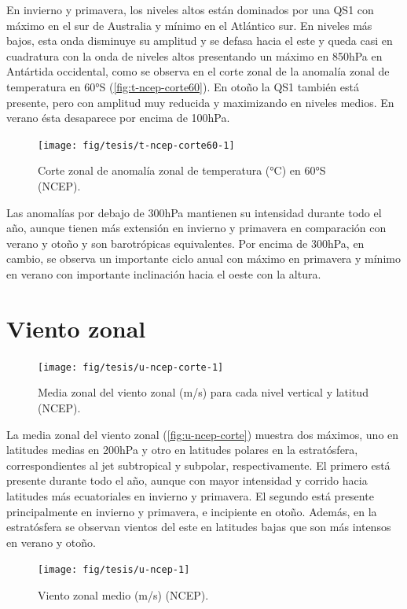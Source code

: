 \documentclass[spanish,a4paper,12pt,oneside]{book}
\begin{document}
En invierno y primavera, los niveles altos están dominados por una QS1
con máximo en el sur de Australia y mínimo en el Atlántico sur. En
niveles más bajos, esta onda disminuye su amplitud y se defasa hacia el
este y queda casi en cuadratura con la onda de niveles altos presentando
un máximo en 850hPa en Antártida occidental, como se observa en el corte
zonal de la anomalía zonal de temperatura en 60°S
(\autoref{fig:t-ncep-corte60}). En otoño la QS1 también está presente,
pero con amplitud muy reducida y maximizando en niveles medios. En
verano ésta desaparece por encima de 100hPa.

\begin{figure}
\texttt{[image: fig/tesis/t-ncep-corte60-1]} \caption{Corte zonal de anomalía zonal de temperatura (°C) en 60°S (NCEP).}\label{fig:t-ncep-corte60}
\end{figure}

Las anomalías por debajo de 300hPa mantienen su intensidad durante todo
el año, aunque tienen más extensión en invierno y primavera en
comparación con verano y otoño y son barotrópicas equivalentes. Por
encima de 300hPa, en cambio, se observa un importante ciclo anual con
máximo en primavera y mínimo en verano con importante inclinación hacia
el oeste con la altura.

\section{Viento zonal}\label{viento-zonal}

\begin{figure}
\texttt{[image: fig/tesis/u-ncep-corte-1]} \caption{Media zonal del viento zonal (m/s) para cada nivel vertical y latitud (NCEP).}\label{fig:u-ncep-corte}
\end{figure}

La media zonal del viento zonal (\autoref{fig:u-ncep-corte}) muestra dos
máximos, uno en latitudes medias en 200hPa y otro en latitudes polares
en la estratósfera, correspondientes al jet subtropical y subpolar,
respectivamente. El primero está presente durante todo el año, aunque
con mayor intensidad y corrido hacia latitudes más ecuatoriales en
invierno y primavera. El segundo está presente principalmente en
invierno y primavera, e incipiente en otoño. Además, en la estratósfera
se observan vientos del este en latitudes bajas que son más intensos en
verano y otoño.

\begin{landscape}\begin{figure}

{\centering \texttt{[image: fig/tesis/u-ncep-1]} 

}

\caption{Viento zonal medio (m/s) (NCEP).}\label{fig:u-ncep}
\end{figure}
\end{landscape}
\end{document}
